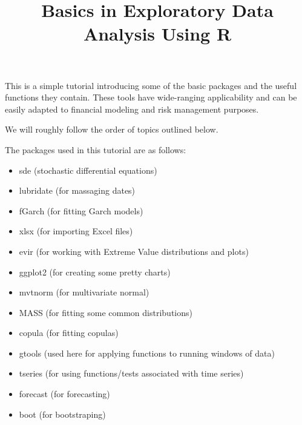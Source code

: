 \documentclass[10pt]{article}\usepackage[]{graphicx}\usepackage[]{color}
\begin{document}
\tableofcontents

\title{Basics in Exploratory Data Analysis Using R}
\date{}
\maketitle

This is a simple tutorial introducing some of the basic packages and the useful functions they contain. These tools have wide-ranging applicability and can be easily adapted to financial modeling and risk management purposes.

We will roughly follow the order of topics outlined below.\\

\vspace{5mm}

The packages used in this tutorial are as follows:  
\begin{itemize}
\item sde (stochastic differential equations)  
\item lubridate (for massaging dates)  
\item fGarch (for fitting Garch models)  
\item xlsx (for importing Excel files)  
\item evir (for working with Extreme Value distributions and plots)  
\item ggplot2 (for creating some pretty charts)  
\item mvtnorm (for multivariate normal)  
\item MASS (for fitting some common distributions)  
\item copula (for fitting copulas)  
\item gtools (used here for applying functions to running windows of data)  
\item tseries (for using functions/tests associated with time series)  
\item forecast (for forecasting)  
\item boot (for bootstraping)  
\end{itemize}
\end{document}
